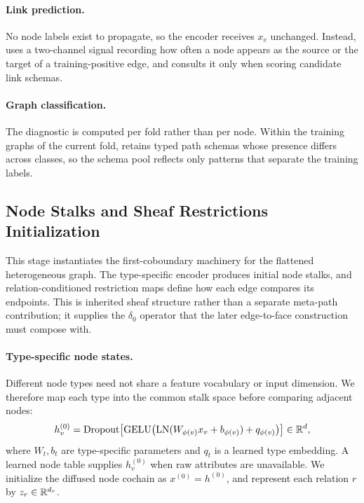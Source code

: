 \paragraph{Link prediction.}
No node labels exist to propagate, so the encoder receives \(x_v\) unchanged.  Instead, \ampss{}
uses a two-channel signal recording how often a node appears as the source or the target of a
training-positive edge, and consults it only when scoring candidate link schemas.

\paragraph{Graph classification.}
The diagnostic is computed per fold rather than per node.  Within the training graphs of the
current fold, \ampss{} retains typed path schemas whose presence differs across classes, so the
schema pool reflects only patterns that separate the training labels.

\subsection{Node Stalks and Sheaf Restrictions Initialization}

This stage instantiates the first-coboundary machinery for the flattened heterogeneous graph. The
type-specific encoder produces initial node stalks, and relation-conditioned restriction maps
define how each edge compares its endpoints. This is inherited sheaf structure rather than a
separate meta-path contribution; it supplies the \(\delta_0\) operator that the later
edge-to-face construction must compose with.

\paragraph{Type-specific node states.}
Different node types need not share a feature vocabulary or input dimension.  We therefore map
each type into the common stalk space before comparing adjacent nodes:
\begin{equation}
  h_v^{(0)}
  =\operatorname{Dropout}\!\left[
    \operatorname{GELU}\!\left(
      \operatorname{LN}(W_{\phi(v)}x_v+b_{\phi(v)})+q_{\phi(v)}
    \right)
  \right]\in\mathbb{R}^d ,
  \label{eq:node-encoder}
\end{equation}
where \(W_t,b_t\) are type-specific parameters and \(q_t\) is a learned type embedding.  A learned
node table supplies \(h_v^{(0)}\) when raw attributes are unavailable.  We initialize the diffused
node cochain as \(x^{(0)}=h^{(0)}\), and represent each relation \(r\) by
\(z_r\in\mathbb{R}^{d_r}\).

